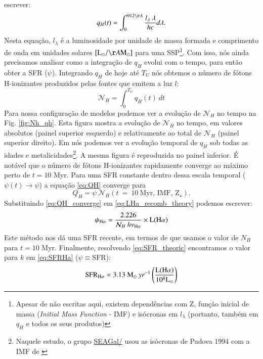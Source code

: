 escrever:
\begin{equation}
	q_H(t) = \int_0^{912\AA} \frac{l_\lambda\ \lambda}{h c} d\lambda.
	\label{eq:qH}
\end{equation}
\noindent Nesta equação, $l_\lambda$ é a luminosidade por unidade de massa formada e comprimento de
onda em unidades solares $[\textrm{L}_\odot/\AA\textrm{M}_\odot]$ para uma SSP\footnote{Apesar de
não escritas aqui, existem dependências com Z, função inicial de massa ({\em Initial Mass Function}
- IMF) e isócronas em $l_\lambda$ (portanto, também em $q_H$ e todos os seus produtos)}. Com isso,
nós ainda precisamos analisar como a integração de $q_H$ evolui com o tempo, para então obter
a SFR ($\psi$). Integrando $q_H$ de hoje até $T_U$ nós obtemos o número de fótons H-ionizantes
produzidos pelas fontes que emitem a luz $l$:
\begin{equation}
	\mathcal{N}_H = \int_0^{T_U} q_H(t)\ dt
\end{equation}
Para nossa configuração de modelos podemos ver a evolução de $\mathcal{N}_H$ no tempo na Fig.
\ref{fig:Nh_qh}. Esta figura mostra a evolução de $\mathcal{N}_H$ no tempo, em valores absolutos
(painel superior esquerdo) e relativamente ao total de $\mathcal{N}_H$ (painel superior direito).
Em \citet[Fig. 2b]{CidFernandes.etal.2011a} nós podemos ver a evolução temporal de $q_H$ sob
todas as idades e metalicidades\footnote{Naquele estudo, o grupo
\href{http://starlight.ufsc.br}{SEAGal/\STARLIGHT} usou as isócronas de Padova 1994 com a IMF de
\citet{Chabrier.2003a}}. A mesma figura é reproduzida no painel inferior. É notável que o número de
fótons H-ionizantes rapidamente converge ao máximo perto de $t = 10$ Myr. Para uma SFR constante
dentro dessa escala temporal ($\psi(t)\rightarrow \psi$) a equação \eqref{eq:QH} converge
para
\begin{equation}
	Q_H = \psi\ \mathcal{N}_H(t\ =\ 10\ \textrm{Myr, IMF, Z}{}_\star).
	\label{eq:QH_converge}
\end{equation}
\noindent Substituindo \eqref{eq:QH_converge} em \eqref{eq:LHa_recomb_theory} podemos escrever:
\begin{equation}
	\psi_{\Halpha} = \frac{2.226}{\mathcal{N}_H\ h \nu_{\Halpha}} \times \mathrm{L}(\Halpha)
	\label{eq:SFR_theoric}
\end{equation}
\noindent Este método nos dá uma SFR recente, em termos de que usamos o valor de $N_H$ para $t = 10$
Myr. Finalmente, resolvendo \eqref{eq:SFR_theoric} encontramos o valor para $k$ em \eqref{eq:SFRHa}
($\psi \equiv \mathrm{SFR}$):
\begin{equation}
	\label{eq:SFRNeb}
	\mathrm{SFR}_{\Halpha} = 3.13\ \mathrm{M}_\odot\ yr^{-1}
	\left(\frac{\mathrm{L}(\Halpha)}{10^8\mathrm{L}_\odot}\right)
\end{equation}

